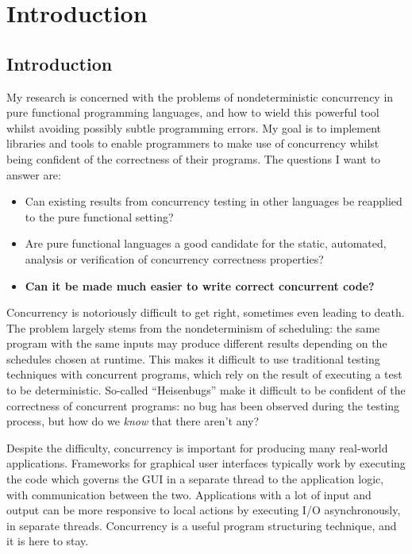 \part{Introduction}


\chapter{Introduction}
\label{chp:intro}

My research is concerned with the problems of nondeterministic
concurrency in pure functional programming languages, and how to wield
this powerful tool whilst avoiding possibly subtle programming
errors. My goal is to implement libraries and tools to enable
programmers to make use of concurrency whilst being confident of the
correctness of their programs. The questions I want to answer are:

\begin{itemize}
  \item Can existing results from concurrency testing in other
    languages be reapplied to the pure functional setting?

  \item Are pure functional languages a good candidate for the static,
    automated, analysis or verification of concurrency correctness
    properties?

  \item \textbf{Can it be made much easier to write correct concurrent
      code?}
\end{itemize}

Concurrency is notoriously difficult to get right\cite{overrated},
sometimes even leading to death\cite{therac25}. The problem largely
stems from the nondeterminism of scheduling: the same program with the
same inputs may produce different results depending on the schedules
chosen at runtime. This makes it difficult to use traditional testing
techniques with concurrent programs, which rely on the result of
executing a test to be deterministic. So-called ``Heisenbugs'' make it
difficult to be confident of the correctness of concurrent programs:
no bug has been observed during the testing process, but how do we
\textit{know} that there aren't any?

Despite the difficulty, concurrency is important for producing many
real-world applications. Frameworks for graphical user interfaces
typically work by executing the code which governs the GUI in a
separate thread to the application logic, with communication between
the two. Applications with a lot of input and output can be more
responsive to local actions by executing I/O asynchronously, in
separate threads. Concurrency is a useful program structuring
technique, and it is here to stay.

